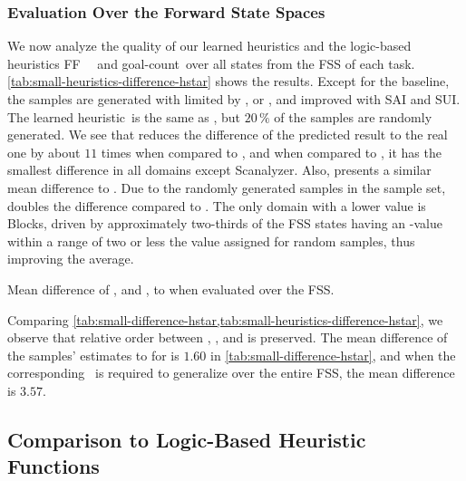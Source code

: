 \subsubsection{Evaluation Over the Forward State Spaces}
\label{sec:small-exps-hvalue-fss}

We now analyze the quality of our learned heuristics and the logic-based heuristics FF~\hff~\cite{hoffmann2001ff} and goal-count~\hgc over all states from the FSS of each task. \cref{tab:small-heuristics-difference-hstar} shows the results. Except for the baseline, the samples are generated with \bfsrw limited by \rldefault, \rlfacts or \rlmeanfx, and improved with SAI and SUI. The learned heuristic~\hnnrs is the same as \hnnl{\rlmeanfx}, but $20\,\%$ of the samples are randomly generated. We see that \hnnl{\rlmeanfx} reduces the difference of the predicted result to the real one by about $11$ times when compared to \hnnbase, and when compared to \hgc, it has the smallest difference in all domains except Scanalyzer. Also, \hnnl{\rlmeanfx} presents a similar mean difference to \hff. Due to the randomly generated samples in the sample set, \hnnrs doubles the difference compared to \hnnl{\rlmeanfx}. The only domain with a lower value is Blocks, driven by approximately two-thirds of the FSS states having an \hstar-value within a range of two or less the value assigned for random samples, thus improving the average.

\begin{table}[tb]
    \caption[Mean difference of heuristics to \hstar when evaluated over the FSS.]{Mean difference of \hff, \hgc and \hnn, to \hstar when evaluated over the FSS.}
    \label{tab:small-heuristics-difference-hstar}
    \addmargin
    \centering
    
\end{table}

Comparing \cref{tab:small-difference-hstar,tab:small-heuristics-difference-hstar}, we observe that relative order between \rldefault, \rlfacts, and \rlmeanfx is preserved. The mean difference of the samples' estimates to \hstar for \rlmeanfx is $1.60$ in \cref{tab:small-difference-hstar}, and when the corresponding~\hnnl{\rlmeanfx} is required to generalize over the entire FSS, the mean difference is $3.57$.

\subsection{Comparison to Logic-Based Heuristic Functions}
\label{sec:small-exps-hvalue-comparison}

